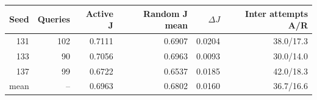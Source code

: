 \begin{tabular}{rrrrrr}
\toprule
Seed & Queries & Active J & Random J mean & $\Delta J$ & Inter attempts A/R \\
\midrule
131 & 102 & 0.7111 & 0.6907 & 0.0204 & 38.0/17.3 \\
133 & 90 & 0.7056 & 0.6963 & 0.0093 & 30.0/14.0 \\
137 & 99 & 0.6722 & 0.6537 & 0.0185 & 42.0/18.3 \\
\midrule
mean & -- & 0.6963 & 0.6802 & 0.0160 & 36.7/16.6 \\
\bottomrule
\end{tabular}
